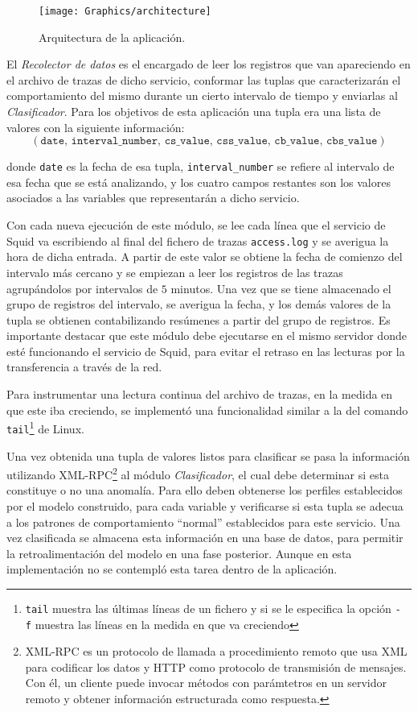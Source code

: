 \begin{figure}[ht]
 \begin{center}
  \texttt{[image: Graphics/architecture]}
 \end{center}
 \caption{Arquitectura de la aplicación.}
 \label{fig:architecture}
\end{figure}

El \emph{Recolector de datos} es el encargado de leer los registros que van
apareciendo en el archivo de trazas de dicho servicio, conformar las tuplas que
caracterizarán el comportamiento del mismo durante un cierto intervalo de tiempo
y enviarlas al \emph{Clasificador}. Para los objetivos de esta aplicación una
tupla era una lista de valores con la siguiente información:
$$ (\texttt{date, interval\_number, cs\_value, css\_value, cb\_value, cbs\_value})$$

donde \texttt{date} es la fecha de esa tupla, \texttt{interval\_number} se
refiere al intervalo de esa fecha que se está analizando, y los cuatro campos
restantes son los valores asociados a las variables que representarán a dicho
servicio.

Con cada nueva ejecución de este módulo, se lee cada línea que el servicio de
Squid va escribiendo al final del fichero de trazas \texttt{access.log} y se
averigua la hora de dicha entrada. A partir de este valor se obtiene  la fecha
de comienzo del intervalo más cercano y se empiezan a leer los registros de las
trazas agrupándolos por intervalos de $5$ minutos. Una vez que se tiene
almacenado el grupo de registros del intervalo, se averigua la fecha, y los
demás valores de la tupla se obtienen contabilizando resúmenes a partir del
grupo de registros. Es importante destacar que este módulo debe ejecutarse en el
mismo servidor donde esté funcionando el servicio de Squid, para evitar el
retraso en las lecturas por la transferencia a través de la red.

Para instrumentar una lectura continua del archivo de trazas, en la medida en
que este iba creciendo, se implementó una funcionalidad similar a la del comando
\texttt{tail}\footnote{\texttt{tail} muestra las últimas líneas de un fichero y
si se le especifica la opción \texttt{- f} muestra las líneas en la medida en
que va creciendo} de Linux. 

Una vez obtenida una tupla de valores listos para clasificar se pasa la
información utilizando XML-RPC\footnote{XML-RPC es un protocolo de llamada a
procedimiento remoto que usa XML para codificar los datos y HTTP como protocolo
de transmisión de mensajes. Con él, un cliente puede invocar métodos con
parámtetros en un servidor remoto y obtener información estructurada como
respuesta.} al módulo \emph{Clasificador}, el cual debe determinar si esta
constituye o no una anomalía. Para ello deben obtenerse los perfiles
establecidos por el modelo construido, para cada variable y verificarse si esta
tupla se adecua a los patrones de comportamiento ``normal'' establecidos para
este servicio. Una vez clasificada se almacena esta información en una base de
datos, para permitir la retroalimentación del modelo en una fase posterior.
Aunque en esta implementación no se contempló esta tarea dentro de la
aplicación.

